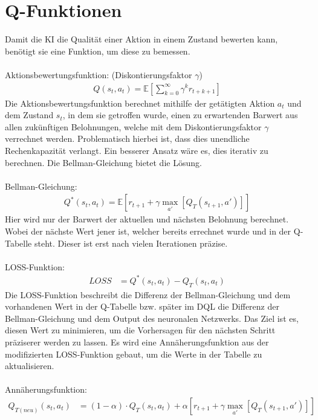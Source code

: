 \documentclass[12pt,titlepage]{article}
\begin{document}
\section{Q-Funktionen}
Damit die KI die Qualität einer Aktion in einem Zustand bewerten kann, benötigt sie eine Funktion, um diese zu bemessen.
\\\\
Aktionsbewertungsfunktion: (Diskontierungsfaktor $\gamma$)
\begin{align*}
Q(s_t,a_t) = \mathbb{E} \left[ \sum\limits_{k=0}^{\infty} \gamma^{k} r_{t+k+1} \right]
\end{align*}
Die Aktionsbewertungsfunktion berechnet mithilfe der getätigten Aktion $a_t$ und dem Zustand $s_t$, in dem sie getroffen wurde, einen zu erwartenden Barwert aus allen zukünftigen Belohnungen, welche mit dem Diskontierungsfaktor $\gamma$ verrechnet werden. Problematisch hierbei ist, dass dies unendliche Rechenkapazität verlangt. Ein besserer Ansatz wäre es, dies iterativ zu berechnen. Die Bellman-Gleichung bietet die Lösung. 
\\\\
Bellman-Gleichung:
\begin{align*}
Q^{*}(s_t,a_t) = \mathbb{E} \left[ r_{t+1} + \gamma \max\limits_{a'} \left[ Q_T(s_{t+1}, a') \right] \right]
\end{align*}
Hier wird nur der Barwert der aktuellen und nächsten Belohnung berechnet. Wobei der nächste Wert jener ist, welcher bereits errechnet wurde und in der Q-Tabelle steht. Dieser ist erst nach vielen Iterationen präzise.
\\\\
LOSS-Funktion:
\begin{align*}
LOSS &= Q^{*}(s_t,a_t) - Q_T(s_t,a_t)
\end{align*}
Die LOSS-Funktion beschreibt die Differenz der Bellman-Gleichung und dem vorhandenen Wert in der Q-Tabelle bzw. später im DQL die Differenz der Bellman-Gleichung und dem Output des neuronalen Netzwerks. Das Ziel ist es, diesen Wert zu minimieren, um die Vorhersagen für den nächsten Schritt präziserer werden zu lassen.
Es wird eine Annäherungsfunktion aus der modifizierten LOSS-Funktion gebaut, um die Werte in der Tabelle zu aktualisieren. 
\\\\
Annäherungsfunktion:
\begin{align*}
Q_{T(neu)}(s_t,a_t) &= (1 - \alpha) \cdot Q_T(s_t,a_t) + \alpha \left[ r_{t+1} + \gamma \max\limits_{a'} \left[ Q_T(s_{t+1}, a') \right] \right]
\end{align*}
\end{document}
